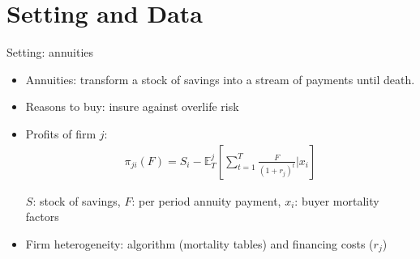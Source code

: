 \documentclass[10pt,aspectratio=169]{beamer}
\begin{document}

\section{Setting and Data}

\begin{frame}{Setting: annuities}\label{slide:setting}
    
    \begin{itemize}%
    \item Annuities: transform a stock of savings into a stream of payments until death.
    \item Reasons to buy: insure against overlife risk
        \item Profits of firm $j$: 
    \begin{align*}
    \pi_{ji}(F) = S_i-  \mathbb{E}^j_{T} \left[\sum_{t=1}^T\frac{F}{(1+r_j)^t}|x_i \right]
    \end{align*}
   
     $S$: stock of savings, $F$: per period annuity payment, $x_i$: buyer mortality factors
    
    \item Firm heterogeneity: algorithm (mortality tables) and financing costs ($r_j$)
    
    \end{itemize}


\end{frame}
\end{document}
